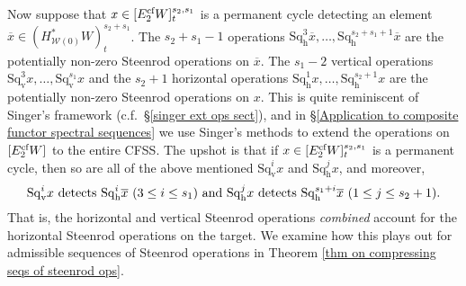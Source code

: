 \documentclass[11pt]{amsart} \renewcommand{\baselinestretch}{1.2}
\theoremstyle{plain}
\numberwithin{equation}{section} %
\theoremstyle{plain}
\numberwithin{equation}{chapter} %
\newcommand{\calw}{\mathcal{W}}
\newcommand{\E}[5]{[E^{#1}_{#2}#3]^{#4}_{#5}}
\newcommand{\dver}{_\mathrm{v}}
\newcommand{\dhor}{_\mathrm{h}}
\newcommand{\Sqh}{\mathrm{Sq}\dhor}
\newcommand{\Sqv}{\mathrm{Sq}\dver}
\newcommand{\CFSS}{CFSS}
\begin{document}
\begin{Introduction}
Now suppose that $x\in \E{\textup{cf}}{2}{W}{s_{2},s_1}{t}$ is a permanent cycle detecting an element $\overline{x}\in (H^*_{\calw(0)}W)^{s_2+s_1}_t$. The $s_2{+}s_1{-}1$ operations $\Sqh^3\overline{x},\ldots,\Sqh^{s_2+s_1+1}\overline{x}$ are the potentially non-zero Steenrod operations on $\overline{x}$. The $s_1{-}2$ vertical operations $\Sqv^3x,\ldots,\Sqv^{s_1}x$ and the $s_2{+}1$ horizontal operations $\Sqh^1x,\ldots,\Sqh^{s_2+1}x$ are the potentially non-zero  Steenrod operations on $x$.
This is quite reminiscent of Singer's framework \cite{MR2245560} (c.f.\ \S\ref{singer ext ops sect}), and in \S\ref{Application to composite functor spectral sequences} we use Singer's methods  to extend the operations on $\E{\textup{cf}}{2}{W}{}{}$ to the entire \CFSS. The upshot is that if $x\in \E{\textup{cf}}{2}{W}{s_{2},s_1}{t}$ is a permanent cycle, then so are all of the above mentioned $\Sqv^ix$ and $\Sqh^jx$, and moreover,
\[\Sqv^ix\textup{ detects }\Sqh^i\overline{x}\ (3\leq i\leq s_1)\textup{ and }\Sqh^jx\textup{ detects }\Sqh^{s_1+i}\overline{x}\ (1\leq j\leq s_2+1).\]
That is, the horizontal and vertical Steenrod operations \emph{combined} account for the horizontal Steenrod operations on the target. We examine how this plays out for admissible sequences of Steenrod operations in Theorem \ref{thm on compressing seqs of steenrod ops}.




\end{Introduction}
\end{document}
